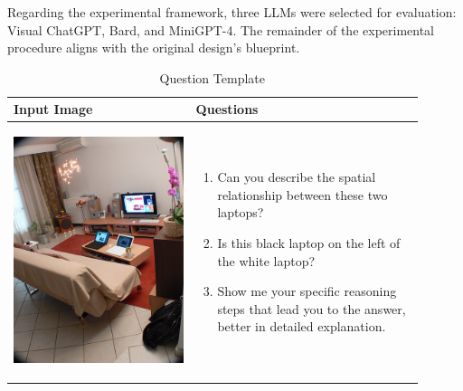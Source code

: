 \documentclass[twocolumn,11pt]{report}
\begin{document}
Regarding the experimental framework, three LLMs were selected for evaluation: Visual ChatGPT\cite{wu2023visual}, Bard, and MiniGPT-4\cite{zhu2023minigpt4}. The remainder of the experimental procedure aligns with the original design's blueprint.
\begin{table}[ht]
    \centering
    \caption{Question Template}
    \label{tab:question_template}
    \begin{tabular}{|p{0.4\linewidth}|p{0.5\linewidth}|}
        \hline
        \textbf{Input Image} &\textbf{Questions}\\
        \hline
        \begin{center} \includegraphics[width=\linewidth]{../image set/hard/000000104739.jpg} \end{center}
        & \begin{enumerate}
            \item Can you describe the spatial relationship between these two laptops?
            \item Is this black laptop on the left of the white laptop?
            \item Show me your specific reasoning steps that lead you to the answer, better in detailed explanation.
        \end{enumerate}\\
        \hline
        \end{tabular}
\end{table}
\end{document}
